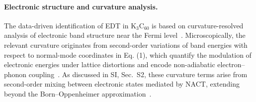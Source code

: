 \documentclass[twocolumn,10pt]{article}
\begin{document}
%
%
%

\paragraph*{Electronic structure and curvature analysis.}

The data-driven identification of EDT in K$_3$C$_{60}$ is based on curvature-resolved analysis of electronic band structure near the Fermi level~\cite{Gunnarsson1997,Capone2009}. Microscopically, the relevant curvature originates from second-order variations of band energies with respect to normal-mode coordinates in Eq. (1), which quantify the modulation of electronic energies under lattice distortions and encode non-adiabatic electron--phonon coupling~\cite{Mead1979,Yarkony1996,Giustino2017}. As discussed in SI, Sec.~S2, these curvature terms arise from second-order mixing between electronic states mediated by NACT, extending beyond the Born--Oppenheimer approximation~\cite{BornOppenheimer1927}.
\end{document}
